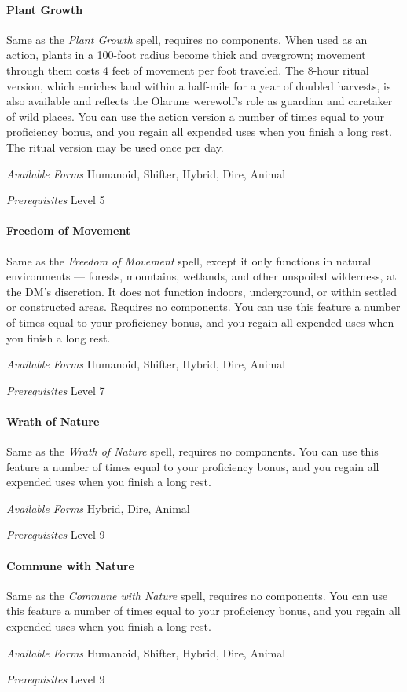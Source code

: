 \documentclass[twocolumn]{dndbook}
\begin{document}
\paragraph*{Plant Growth}
Same as the \emph{Plant Growth} spell, requires no components.
When used as an action, plants in a 100-foot radius become thick and overgrown; movement through them costs 4 feet of movement per foot traveled.
The 8-hour ritual version, which enriches land within a half-mile for a year of doubled harvests, is also available and reflects the Olarune werewolf's role as guardian and caretaker of wild places.
You can use the action version a number of times equal to your proficiency bonus, and you regain all expended uses when you finish a long rest. The ritual version may be used once per day.\par
\emph{Available Forms} Humanoid, Shifter, Hybrid, Dire, Animal\par
\emph{Prerequisites} Level 5\par

\paragraph*{Freedom of Movement}
Same as the \emph{Freedom of Movement} spell, except it only functions in natural environments --- forests, mountains, wetlands, and other unspoiled wilderness, at the DM's discretion.
It does not function indoors, underground, or within settled or constructed areas.
Requires no components.
You can use this feature a number of times equal to your proficiency bonus, and you regain all expended uses when you finish a long rest.\par
\emph{Available Forms} Humanoid, Shifter, Hybrid, Dire, Animal\par
\emph{Prerequisites} Level 7\par

\paragraph*{Wrath of Nature}
Same as the \emph{Wrath of Nature} spell, requires no components.
You can use this feature a number of times equal to your proficiency bonus, and you regain all expended uses when you finish a long rest.\par
\emph{Available Forms} Hybrid, Dire, Animal\par
\emph{Prerequisites} Level 9\par

\paragraph*{Commune with Nature}
Same as the \emph{Commune with Nature} spell, requires no components.
You can use this feature a number of times equal to your proficiency bonus, and you regain all expended uses when you finish a long rest.\par
\emph{Available Forms} Humanoid, Shifter, Hybrid, Dire, Animal\par
\emph{Prerequisites} Level 9\par
\end{document}
